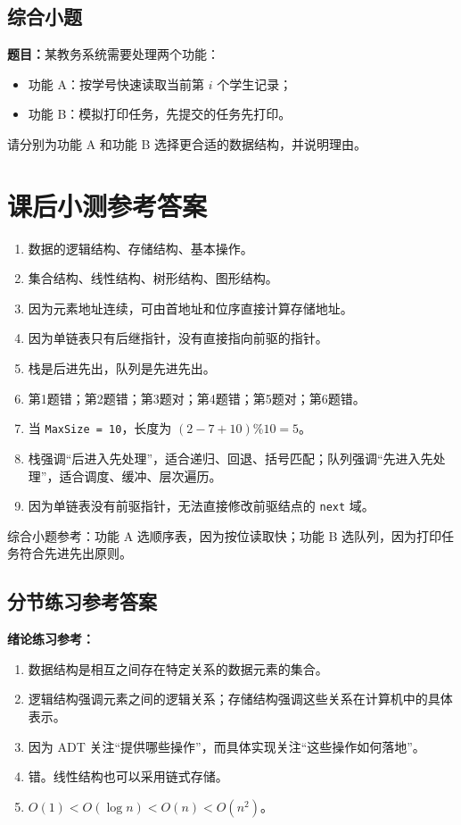 \documentclass{../../note}
\begin{document}
\subsection{综合小题}

\textbf{题目：}某教务系统需要处理两个功能：

\begin{itemize}
  \item 功能 A：按学号快速读取当前第 $i$ 个学生记录；
  \item 功能 B：模拟打印任务，先提交的任务先打印。
\end{itemize}

请分别为功能 A 和功能 B 选择更合适的数据结构，并说明理由。

\section{课后小测参考答案}

\begin{enumerate}
  \item 数据的逻辑结构、存储结构、基本操作。
  \item 集合结构、线性结构、树形结构、图形结构。
  \item 因为元素地址连续，可由首地址和位序直接计算存储地址。
  \item 因为单链表只有后继指针，没有直接指向前驱的指针。
  \item 栈是后进先出，队列是先进先出。
  \item 第1题错；第2题错；第3题对；第4题错；第5题对；第6题错。
  \item 当 \texttt{MaxSize = 10}，长度为 $(2 - 7 + 10) \% 10 = 5$。
  \item 栈强调“后进入先处理”，适合递归、回退、括号匹配；队列强调“先进入先处理”，适合调度、缓冲、层次遍历。
  \item 因为单链表没有前驱指针，无法直接修改前驱结点的 \texttt{next} 域。
\end{enumerate}

综合小题参考：功能 A 选顺序表，因为按位读取快；功能 B 选队列，因为打印任务符合先进先出原则。

\subsection{分节练习参考答案}

\textbf{绪论练习参考：}

\begin{enumerate}
  \item 数据结构是相互之间存在特定关系的数据元素的集合。
  \item 逻辑结构强调元素之间的逻辑关系；存储结构强调这些关系在计算机中的具体表示。
  \item 因为 ADT 关注“提供哪些操作”，而具体实现关注“这些操作如何落地”。
  \item 错。线性结构也可以采用链式存储。
  \item $O(1) < O(\log n) < O(n) < O(n^2)$。
\end{enumerate}
\end{document}
